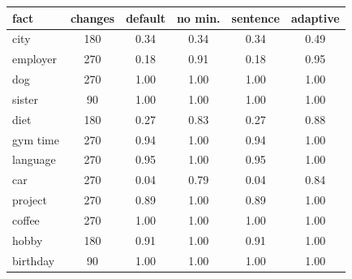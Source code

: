\begin{tabular}{lccccc}
\toprule
fact & changes & default & no min. & sentence & adaptive \\
\midrule
city & 180 & 0.34 & 0.34 & 0.34 & 0.49 \\
employer & 270 & 0.18 & 0.91 & 0.18 & 0.95 \\
dog & 270 & 1.00 & 1.00 & 1.00 & 1.00 \\
sister & 90 & 1.00 & 1.00 & 1.00 & 1.00 \\
diet & 180 & 0.27 & 0.83 & 0.27 & 0.88 \\
gym time & 270 & 0.94 & 1.00 & 0.94 & 1.00 \\
language & 270 & 0.95 & 1.00 & 0.95 & 1.00 \\
car & 270 & 0.04 & 0.79 & 0.04 & 0.84 \\
project & 270 & 0.89 & 1.00 & 0.89 & 1.00 \\
coffee & 270 & 1.00 & 1.00 & 1.00 & 1.00 \\
hobby & 180 & 0.91 & 1.00 & 0.91 & 1.00 \\
birthday & 90 & 1.00 & 1.00 & 1.00 & 1.00 \\
\bottomrule
\end{tabular}
